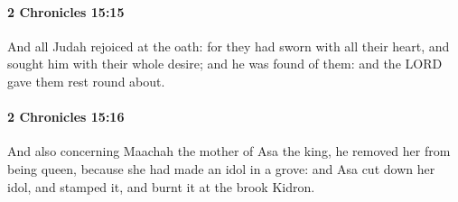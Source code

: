 		\paragraph{2 Chronicles 15:15} %
			\label{2CHRONICLES-15-15}

			And all Judah rejoiced at the oath: for they had sworn with all their heart, and sought him with their whole desire; and he was found of them: and the LORD gave them rest round about.


		\paragraph{2 Chronicles 15:16} %
			\label{2CHRONICLES-15-16}

			And also concerning Maachah the mother of Asa the king, he removed her from being queen, because she had made an idol in a grove: and Asa cut down her idol, and stamped it, and burnt it at the brook Kidron.

